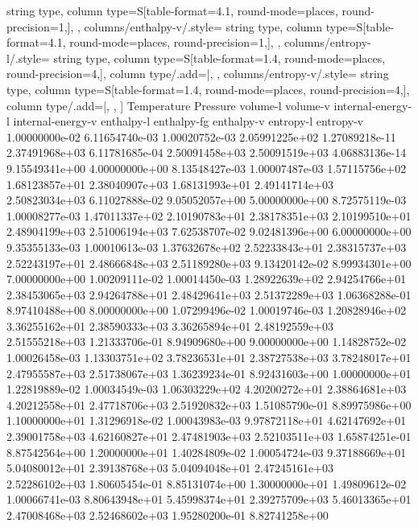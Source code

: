 \documentclass{article}
\begin{document}
\begin{center}
{string type,
column type={S[table-format=4.1, round-mode=places, round-precision=1,]},
},
columns/enthalpy-v/.style={
string type,
column type={S[table-format=4.1, round-mode=places, round-precision=1,]},
},
columns/entropy-l/.style={
string type,
column type={S[table-format=1.4, round-mode=places, round-precision=4,]},
column type/.add={|}{},
},
columns/entropy-v/.style={
string type,
column type={S[table-format=1.4, round-mode=places, round-precision=4,]},
column type/.add={}{|},
},
]
{
Temperature  Pressure  volume-l  volume-v internal-energy-l internal-energy-v enthalpy-l enthalpy-fg enthalpy-v entropy-l entropy-v
  1.00000000e-02   6.11654740e-03   1.00020752e-03   2.05991225e+02   1.27089218e-11   2.37491968e+03   6.11781685e-04   2.50091458e+03   2.50091519e+03   4.06883136e-14   9.15549341e+00
   4.00000000e+00   8.13548427e-03   1.00007487e-03   1.57115756e+02   1.68123857e+01   2.38040907e+03   1.68131993e+01   2.49141714e+03   2.50823034e+03   6.11027888e-02   9.05052057e+00
   5.00000000e+00   8.72575119e-03   1.00008277e-03   1.47011337e+02   2.10190783e+01   2.38178351e+03   2.10199510e+01   2.48904199e+03   2.51006194e+03   7.62538707e-02   9.02481396e+00
   6.00000000e+00   9.35355133e-03   1.00010613e-03   1.37632678e+02   2.52233843e+01   2.38315737e+03   2.52243197e+01   2.48666848e+03   2.51189280e+03   9.13420142e-02   8.99934301e+00
   7.00000000e+00   1.00209111e-02   1.00014450e-03   1.28922639e+02   2.94254766e+01   2.38453065e+03   2.94264788e+01   2.48429641e+03   2.51372289e+03   1.06368288e-01   8.97410488e+00
   8.00000000e+00   1.07299496e-02   1.00019746e-03   1.20828946e+02   3.36255162e+01   2.38590333e+03   3.36265894e+01   2.48192559e+03   2.51555218e+03   1.21333706e-01   8.94909680e+00
   9.00000000e+00   1.14828752e-02   1.00026458e-03   1.13303751e+02   3.78236531e+01   2.38727538e+03   3.78248017e+01   2.47955587e+03   2.51738067e+03   1.36239234e-01   8.92431603e+00
   1.00000000e+01   1.22819889e-02   1.00034549e-03   1.06303229e+02   4.20200272e+01   2.38864681e+03   4.20212558e+01   2.47718706e+03   2.51920832e+03   1.51085790e-01   8.89975986e+00
   1.10000000e+01   1.31296918e-02   1.00043983e-03   9.97872118e+01   4.62147692e+01   2.39001758e+03   4.62160827e+01   2.47481903e+03   2.52103511e+03   1.65874251e-01   8.87542564e+00
   1.20000000e+01   1.40284809e-02   1.00054724e-03   9.37188669e+01   5.04080012e+01   2.39138768e+03   5.04094048e+01   2.47245161e+03   2.52286102e+03   1.80605454e-01   8.85131074e+00
   1.30000000e+01   1.49809612e-02   1.00066741e-03   8.80643948e+01   5.45998374e+01   2.39275709e+03   5.46013365e+01   2.47008468e+03   2.52468602e+03   1.95280200e-01   8.82741258e+00
}
\end{center}
\end{document}
